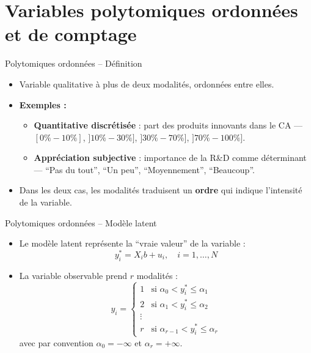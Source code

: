 \documentclass[11pt,aspectratio=169]{beamer}
\begin{document}
\section{Variables polytomiques ordonnées et de comptage}

\begin{frame}{Polytomiques ordonnées -- Définition}

\begin{itemize}

\item Variable qualitative à plus de deux modalités, ordonnées entre elles.\newline

\item \textbf{Exemples :}
  \begin{itemize}
  \item \textbf{Quantitative discrétisée} : part des produits innovants dans le CA --- $[0\%-10\%]$, $]10\%-30\%]$, $]30\%-70\%]$, $]70\%-100\%]$.
  \item \textbf{Appréciation subjective} : importance de la R\&D comme déterminant --- ``Pas du tout'', ``Un peu'', ``Moyennement'', ``Beaucoup''.
  \end{itemize}

\item Dans les deux cas, les modalités traduisent un \textbf{ordre} qui indique l'intensité de la variable.

\end{itemize}

\end{frame}

\begin{frame}{Polytomiques ordonnées -- Modèle latent}

\begin{itemize}

\item Le modèle latent représente la ``vraie valeur'' de la variable :
  \[
  y_i^* = X_i b + u_i, \quad i = 1, \ldots, N
  \]\newline

\item La variable observable prend $r$ modalités :
  \[
  y_i = \begin{cases}
      1 & \text{si } \alpha_0 < y_i^* \leq \alpha_1 \\
      2 & \text{si } \alpha_1 < y_i^* \leq \alpha_2 \\
      \vdots \\
      r & \text{si } \alpha_{r-1} < y_i^* \leq \alpha_r
  \end{cases}
  \]
  avec par convention $\alpha_0 = -\infty$ et $\alpha_r = +\infty$.

\end{itemize}

\end{frame}
\end{document}
